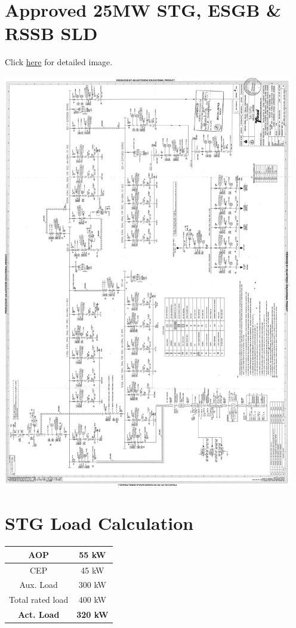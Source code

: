 \documentclass[english,11pt]{report}
\begin{document}
\section{Approved 25MW STG, ESGB & RSSB SLD}
Click \href{http://i.imgur.com/8oG8HFV.jpg}{here} for detailed image.\\
\begin{center}
\includegraphics[width = 5in]{stgapproved.png}
\end{center}

\section{STG Load Calculation}
\begin{center}
\begin{tabular}{ |c|c| } 
 \hline
 AOP & 55 kW \\ \hline
 CEP & 45 kW \\ \hline
 Aux. Load & 300 kW \\ \hline
 Total rated load & 400 kW \\ \hline
 \textbf{Act. Load} & \textbf{320 kW} \\ \hline
\end{tabular}
\end{center}
\end{document}
